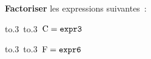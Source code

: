 \documentclass[exercice]{thedocument}%
\begin{document}
%
{\bfseries Factoriser} les expressions suivantes~:\par\noindent
\hbox{\hbox to.3%
\hbox to.3%
$\text{C}=\<expr3;$}\par\vskip5pt\noindent
\hbox{\hbox to.3%
\hbox to.3%
$\text{F}=\<expr6;$}\par\noindent
\end{document}
